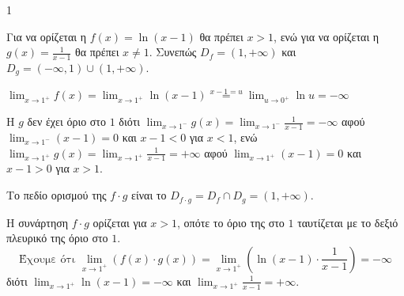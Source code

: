 \begin{ylh}{1}
    \item [Ύλη από εικόνα]
\end{ylh}
\begin{alist}
    \item [\textbf{α)}] Για να ορίζεται η $f(x)=\ln(x-1)$ θα πρέπει $x>1$, ενώ για να ορίζεται η $g(x)=\frac{1}{x-1}$ θα πρέπει $x \neq 1$. Συνεπώς $D_f=(1,+\infty)$ και $D_g=(-\infty,1) \cup (1,+\infty)$.
    \begin{rlist}
        \item $\lim_{x \to 1^+} f(x) = \lim_{x \to 1^+} \ln(x-1) \overset{x-1=u}{=} \lim_{u \to 0^+} \ln u = -\infty$
        \item Η $g$ δεν έχει όριο στο $1$ διότι $\lim_{x \to 1^-} g(x) = \lim_{x \to 1^-} \frac{1}{x-1} = -\infty$
        αφού $\lim_{x \to 1^-}(x-1)=0$ και $x-1<0$ για $x<1$,
        ενώ $\lim_{x \to 1^+} g(x) = \lim_{x \to 1^+} \frac{1}{x-1} = +\infty$
        αφού $\lim_{x \to 1^+}(x-1)=0$ και $x-1>0$ για $x>1$.
    \end{rlist}
    \item [\textbf{β)}]
    \begin{rlist}
        \item Το πεδίο ορισμού της $f \cdot g$ είναι το $D_{f \cdot g} = D_f \cap D_g = (1,+\infty)$.
        \item Η συνάρτηση $f \cdot g$ ορίζεται για $x>1$, οπότε το όριο της στο $1$ ταυτίζεται με το δεξιό πλευρικό της όριο στο $1$.
        \[
        \text{Έχουμε ότι } \lim_{x \to 1^+} (f(x) \cdot g(x)) = \lim_{x \to 1^+} \left(\ln(x-1) \cdot \frac{1}{x-1}\right) = -\infty
        \]
        διότι $\lim_{x \to 1^+} \ln(x-1) = -\infty$ και $\lim_{x \to 1^+} \frac{1}{x-1} = +\infty$.
    \end{rlist}
\end{alist}